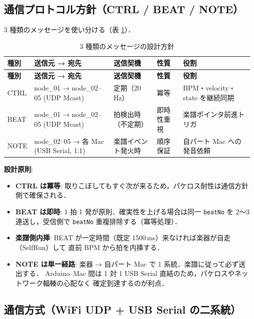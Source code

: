 \documentclass[lualatex,book,paper=a4paper,jafontsize=11.5pt,jafontscale=1.05]{jlreq}
\begin{document}
\subsection{通信プロトコル方針（CTRL / BEAT / NOTE）}\label{subsec:protocol-policy}

3 種類のメッセージを使い分ける（表 \ref{tab:msg-policy}）．

\begin{longtable}{l p{} p{} p{} p{}}
\caption{3 種類のメッセージの設計方針}\label{tab:msg-policy}\\
\toprule
\textbf{種別} & \textbf{送信元 → 宛先} & \textbf{送信契機} & \textbf{性質} & \textbf{役割} \\
\midrule
\endfirsthead
\toprule
\textbf{種別} & \textbf{送信元 → 宛先} & \textbf{送信契機} & \textbf{性質} & \textbf{役割} \\
\midrule
\endhead
CTRL & node\_01 → node\_02--05 (UDP Mcast)        & 定期（20 Hz）       & 冪等         & BPM・velocity・state を継続同期 \\
BEAT & node\_01 → node\_02--05 (UDP Mcast)        & 拍検出時（不定期） & 即時性重視   & 楽譜ポインタ前進トリガ \\
NOTE & node\_02--05 → 各 Mac (USB Serial, 1:1)    & 楽譜イベント発火時 & 順序保証     & 自パート Mac への発音依頼 \\
\bottomrule
\end{longtable}

\textbf{設計原則}:
\begin{itemize}
  \item \textbf{CTRL は冪等}: 取りこぼしてもすぐ次が来るため，パケロス耐性は通信方針側で確保される．
  \item \textbf{BEAT は即時}: 1 拍 1 発が原則．確実性を上げる場合は同一 \texttt{beatNo} を
        2〜3 連送し，受信側で \texttt{beatNo} 重複排除する（冪等処理）．
  \item \textbf{楽譜側内挿}: BEAT が一定時間（既定 1500\,ms）来なければ楽器が自走（SelfRun）して
        直前 BPM から拍を内挿する．
  \item \textbf{NOTE は単一経路}: 楽器 → 自パート Mac で 1 系統．楽譜に従って必ず送出する．
        Arduino--Mac 間は 1 対 1 USB Serial 直結のため，パケロスやネットワーク輻輳の心配なく
        確定到達するのが利点．
\end{itemize}

\subsection{通信方式（WiFi UDP + USB Serial の二系統）}
\end{document}
